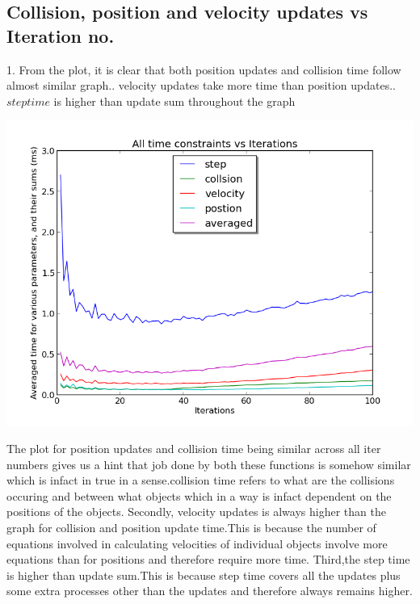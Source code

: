 \documentclass[11pt]{article}
\begin{document}
\subsection{Collision, position and velocity updates vs Iteration no.}
1. From the plot, it is clear that both position updates and collision time follow almost similar graph.. velocity updates take more time than position updates.. $steptime$ is higher than update sum throughout the graph
\begin{center}\includegraphics[scale=0.6]{../details/images/g31_plot02.png}
\end{center}

The plot for position updates and collision time being similar across all iter numbers gives us a hint that job done by both these functions is somehow similar which is infact in true in a sense.collision time refers to what are the collisions occuring and between what objects which in a way is infact dependent on the positions of the objects.\newline
Secondly, velocity updates is always higher than the graph for collision and position update time.This is because the number of equations involved in calculating velocities of individual objects involve more equations than for positions and therefore require more time.\newline
Third,the step time is higher than update sum.This is because step time covers all the updates plus some extra processes other than the updates and therefore always remains higher.
\end{document}
